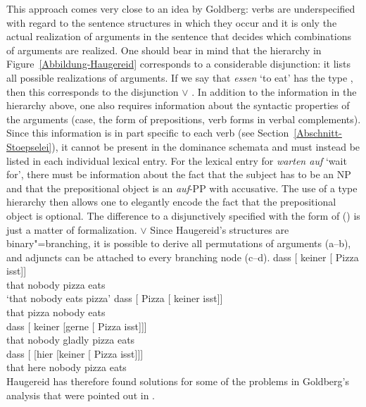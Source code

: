 \begin{exe}
\begin{xlist}[iv.]
\begin{exe}
\begin{xlist}[iv.]
This approach comes very close to an idea by Goldberg: verbs are underspecified with regard to the sentence structures in which they occur and
it is only the actual realization of arguments in the sentence that decides which combinations of arguments are realized.
One should bear in mind that the hierarchy in Figure~\ref{Abbildung-Haugereid} corresponds to a considerable disjunction:
it lists all possible realizations of arguments. If we say that \emph{essen} `to eat' has the type , then this
corresponds to the disjunction  $\vee$ . In addition to the information in the hierarchy above, one also requires information about the syntactic properties of
the arguments (case, the form of prepositions, verb forms in verbal complements). Since this information is in part specific to each verb
(see Section~\ref{Abschnitt-Stoepselei}), it cannot be present in the dominance schemata and must instead be listed in each individual
lexical entry. For the lexical entry for \emph{warten auf} `wait for', there must be information about the fact that the subject has to be an
NP and that the prepositional object is an \emph{auf}-PP with accusative. The use of a type hierarchy then allows one to elegantly encode
the fact that the prepositional object is optional. The difference to a disjunctively specified
\subcatl with the form of () is just a matter of formalization.
\ea
\subcat {} $\vee$ 
\z
%
Since Haugereid's structures are binary"=branching, it is possible to derive all permutations of arguments (a--b), and adjuncts can be
attached to every branching node (c--d). 
\eal
\ex 
\gll dass [ keiner [ Pizza isst]]\\
     that {} nobody {} pizza eats\\
\glt `that nobody eats pizza'
\ex 
\gll dass [ Pizza [ keiner isst]]\\
	 that {} pizza {} nobody eats\\
\ex 
\gll dass [ keiner [gerne [ Pizza isst]]]\\
	 that {} nobody \spacebr{}gladly {} pizza eats\\
\ex 
\gll dass [ [hier [keiner [ Pizza isst]]]\\
	 that {} \spacebr{}here \spacebr{}nobody {} pizza eats\\
\zl
Haugereid has therefore found solutions for some of the problems in Goldberg's analysis that were
pointed out in .

\end{xlist}
\end{exe}
\end{xlist}
\end{exe}
